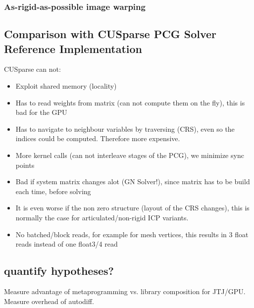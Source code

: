 \cite{wu2014sfs}

\subsubsection{As-rigid-as-possible image warping}

\subsection{Comparison with CUSparse PCG Solver Reference Implementation}

CUSparse can not:
\begin{itemize}
\item Exploit shared memory (locality)
\item Has to read weights from matrix (can not compute them on the fly), this is bad for the GPU
\item Has to navigate to neighbour variables by traversing (CRS), even so the indices could be computed. Therefore more expensive.
\item More kernel calls (can not interleave stages of the PCG), we minimize sync points
\item Bad if system matrix changes alot (GN Solver!), since matrix has to be build each time, before solving
\item It is even worse if the non zero structure (layout of the CRS changes), this is normally the case for articulated/non-rigid ICP variants.
\item No batched/block reads, for example for mesh vertices, this results in 3 float reads instead of one float3/4 read
\end{itemize}

\subsection{quantify hypotheses?}
Measure advantage of metaprogramming vs. library composition for JTJ/GPU.
Measure overhead of autodiff.